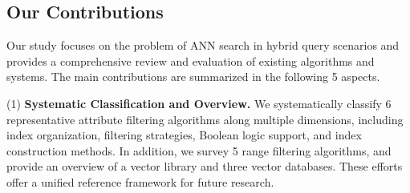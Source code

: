 \documentclass[sigconf, nonacm]{acmart}
\begin{document}
	\subsection{Our Contributions}
	
	Our study focuses on the problem of ANN search in hybrid query scenarios and provides a comprehensive review and evaluation of existing algorithms and systems. The main contributions are summarized in the following 5 aspects.
	
	(1)\textbf{ Systematic Classification and Overview.}
	We systematically classify 6 representative attribute filtering algorithms along multiple dimensions, including index organization, filtering strategies, Boolean logic support, and index construction methods. In addition, we survey 5 range filtering algorithms, and provide an overview of a vector library and three vector databases. These efforts offer a unified reference framework for future research.
	
\end{document}
